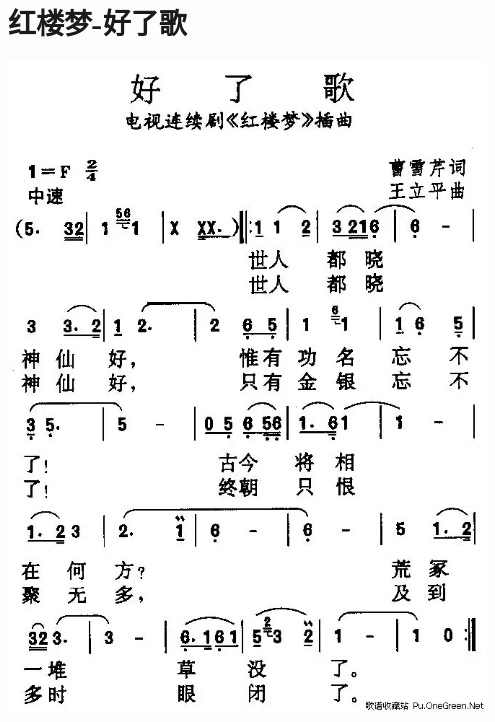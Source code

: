 \documentclass[cn,pad,twocol]{elegantbook}
\begin{document}
\section{红楼梦-好了歌}\includegraphics[width=0.95\textwidth]{dongxiao/20200819/红楼梦-好了歌.jpeg}
\end{document}

